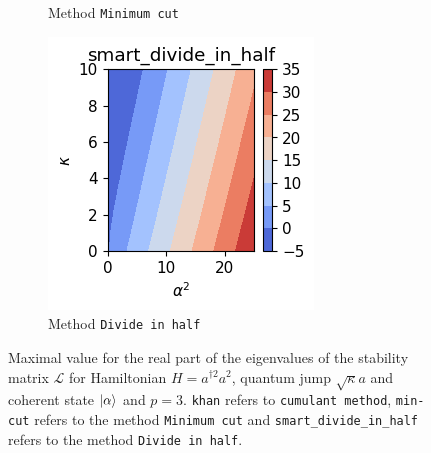\begin{figure}[h!]
\begin{subfigure}{0.32\linewidth}
        \caption{Method \texttt{Minimum cut}}
        \label{fig:H_Self_Kerr_and_losses_1_p_3_rule_min-cut}
    \end{subfigure}
    \hfill
    \begin{subfigure}{0.32\linewidth}
        \centering
        \includegraphics[width=\linewidth]{Pics/H_Self_Kerr_and_losses_1_p_3_rule_smart_divide_in_half.pdf}
        \caption{Method \texttt{Divide in half}}
        \label{fig:H_Self_Kerr_and_losses_1_p_3_rule_smart_divide_in_half}
    \end{subfigure}
    \caption{Maximal value for the real part of the eigenvalues of the stability matrix $\mathcal{L}$ for Hamiltonian $H = a^{\dagger 2} a^2$, quantum jump $\sqrt{\kappa} a$ and coherent state $\ket{\alpha}$ and $p=3$. \texttt{khan} refers to \texttt{cumulant method}, \texttt{min-cut} refers to the method \texttt{Minimum cut} and \texttt{smart\_divide\_in\_half} refers to the method \texttt{Divide in half}.}
    \label{fig:CompStabKerr}
\end{figure}

